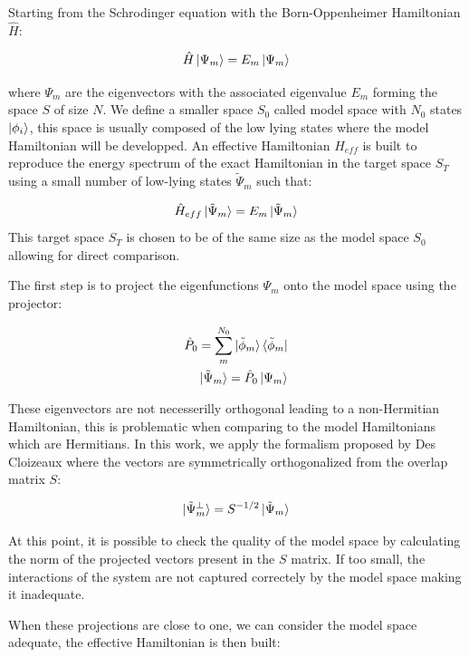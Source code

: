 \documentclass[10pt]{report}
\numberwithin{equation}{section}
\begin{document}
Starting from the Schrodinger equation with the Born-Oppenheimer Hamiltonian $\hat{H}$:

\begin{equation}
    \hat{H}\ket{\Psi_m}=E_m\ket{\Psi_m}
\end{equation}

where $\Psi_m$ are the eigenvectors with the associated eigenvalue $E_m$ forming the space $S$ of size $N$. 
We define a smaller space $S_0$ called model space with $N_0$ states $\ket{\phi_i}$, this space is usually composed of the low lying states where the model Hamiltonian will be developped.
An effective Hamiltonian $H_{eff}$  is built to reproduce the energy spectrum of the exact Hamiltonian in the target space $S_T$ using a small number of low-lying states $\tilde{\Psi}_m$ such that:

\begin{equation}
    \hat{H}_{eff}\ket{\tilde{\Psi}_m}=E_m \ket{\tilde{\Psi}_m}
\end{equation}
This target space $S_T$ is chosen to be of the same size as the model space $S_0$ allowing for direct comparison.

The first step is to project the eigenfunctions $\Psi_m$ onto the model space using the projector:

\begin{align}
    \hat{P}_0=\sum_{m}^{N_0} \ket{\tilde{\phi}_m} \bra{\tilde{\phi}_m}\\
    \ket{\tilde{\Psi}_m}=\hat{P}_0 \ket{\Psi_m}
\end{align}

These eigenvectors are not necesserilly orthogonal leading to a non-Hermitian Hamiltonian, this is problematic when comparing to the model Hamiltonians which are Hermitians.
In this work, we apply the formalism proposed by Des Cloizeaux where the vectors are symmetrically orthogonalized from the overlap matrix $S$:

\begin{equation}
    \ket{\tilde{\Psi}_m^\bot}=S^{-1/2} \ket{\tilde{\Psi}_m}
\end{equation}

At this point, it is possible to check the quality of the model space by calculating the norm of the projected vectors present in the $S$ matrix.
If too small, the interactions of the system are not captured correctely by the model space making it inadequate. 
\par When these projections are close to one, we can consider the model space adequate, the effective Hamiltonian is then built:
\end{document}
